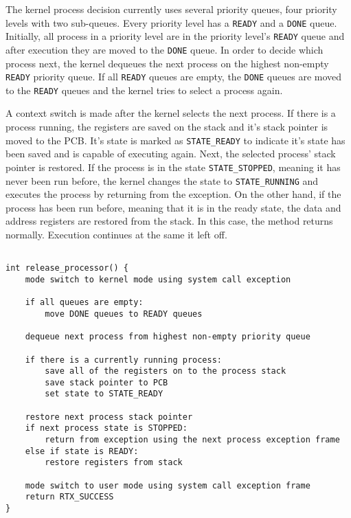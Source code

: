 \documentclass[oneside]{report}
\begin{document}
The kernel process decision currently uses several priority queues, four
priority levels with two sub-queues. Every priority level has a \texttt{READY} and a
\texttt{DONE} queue. Initially, all process in a priority level are in the
priority level's \texttt{READY} queue and after execution they are moved to the
\texttt{DONE} queue. In order to decide which process next, the kernel dequeues
the next process on the highest non-empty \texttt{READY} priority queue. If all
\texttt{READY} queues are empty, the \texttt{DONE} queues are moved to the
\texttt{READY} queues and the kernel tries to select a process again.

A context switch is made after the kernel selects the next process. If there is
a process running, the registers are saved on the stack and it's stack pointer
is moved to the PCB. It's state is marked as \texttt{STATE\_READY} to indicate
it's state has been saved and is capable of executing again. Next, the selected
process' stack pointer is restored. If the process is in the state
\texttt{STATE\_STOPPED}, meaning it has never been run before, the kernel
changes the state to \texttt{STATE\_RUNNING} and executes the process by
returning from the exception. On the other hand, if the process has been run
before, meaning that it is in the ready state, the data and address registers
are restored from the stack. In this case, the method returns normally.
Execution continues at the same it left off.

\begin{lstlisting}

int release_processor() {
    mode switch to kernel mode using system call exception

    if all queues are empty:
        move DONE queues to READY queues

    dequeue next process from highest non-empty priority queue

    if there is a currently running process:
        save all of the registers on to the process stack
        save stack pointer to PCB
        set state to STATE_READY

    restore next process stack pointer
    if next process state is STOPPED:
        return from exception using the next process exception frame
    else if state is READY: 
        restore registers from stack
    
    mode switch to user mode using system call exception frame
    return RTX_SUCCESS
}
\end{lstlisting}
\end{document}
